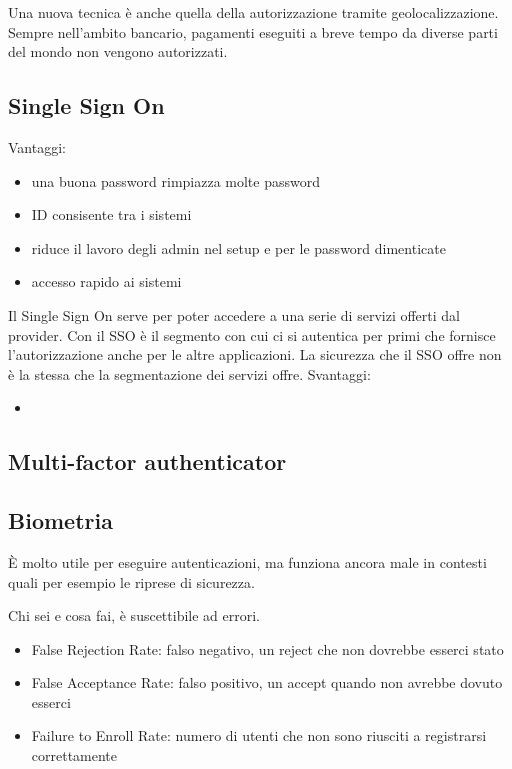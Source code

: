 Una nuova tecnica è anche quella della autorizzazione tramite 
geolocalizzazione. Sempre nell'ambito bancario, pagamenti eseguiti a breve 
tempo da diverse parti del mondo non vengono autorizzati.

\subsection{Single Sign On}

Vantaggi:
\begin{itemize}
\item una buona password rimpiazza molte password
\item ID consisente tra i sistemi
\item riduce il lavoro degli admin nel setup e per le password dimenticate
\item accesso rapido ai sistemi
\end{itemize}


Il Single Sign On serve per poter accedere a una serie di servizi offerti dal 
provider. Con il SSO è il segmento con cui ci si autentica per primi che 
fornisce l'autorizzazione anche per le altre applicazioni.
La sicurezza che il SSO offre non è la stessa che la segmentazione dei servizi 
offre.
Svantaggi:
\begin{itemize}
\item %
\end{itemize}

\subsection{Multi-factor authenticator}

\subsection{Biometria}

È molto utile per eseguire autenticazioni, ma funziona ancora male in contesti 
quali per esempio le riprese di sicurezza.

Chi sei e cosa fai, è suscettibile ad errori.

\begin{itemize}
\item False Rejection Rate: falso negativo, un reject che non dovrebbe esserci 
stato
\item False Acceptance Rate: falso positivo, un accept quando non avrebbe 
dovuto esserci
\item Failure to Enroll Rate: numero di utenti che non sono riusciti a 
registrarsi correttamente
\end{itemize}


